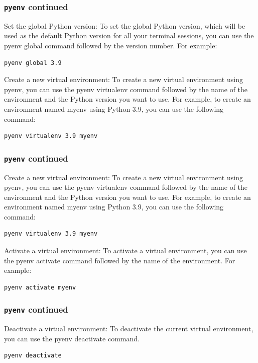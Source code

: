 \documentclass{beamer}
\begin{document}
\begin{frame}[fragile]
  \frametitle{\texttt{pyenv} continued}

  Set the global Python version: To set the global Python version, which will be used as the default Python version for all your terminal sessions, you can use the pyenv global command followed by the version number. For example:

  \begin{lstlisting}
pyenv global 3.9
\end{lstlisting}

  Create a new virtual environment: To create a new virtual environment using pyenv, you can use the pyenv virtualenv command followed by the name of the environment and the Python version you want to use. For example, to create an environment named myenv using Python 3.9, you can use the following command:

  \begin{lstlisting}
pyenv virtualenv 3.9 myenv
\end{lstlisting}

\end{frame}

\begin{frame}[fragile]
  \frametitle{\texttt{pyenv} continued}

  Create a new virtual environment: To create a new virtual environment using pyenv, you can use the pyenv virtualenv command followed by the name of the environment and the Python version you want to use. For example, to create an environment named myenv using Python 3.9, you can use the following command:

  \begin{lstlisting}
pyenv virtualenv 3.9 myenv
\end{lstlisting}

  Activate a virtual environment: To activate a virtual environment, you can use the pyenv activate command followed by the name of the environment. For example:

  \begin{lstlisting}
pyenv activate myenv
\end{lstlisting}

\end{frame}

\begin{frame}[fragile]
  \frametitle{\texttt{pyenv} continued}

  Deactivate a virtual environment: To deactivate the current virtual environment, you can use the pyenv deactivate command.

  \begin{lstlisting}
pyenv deactivate
\end{lstlisting}

\end{frame}
\end{document}
